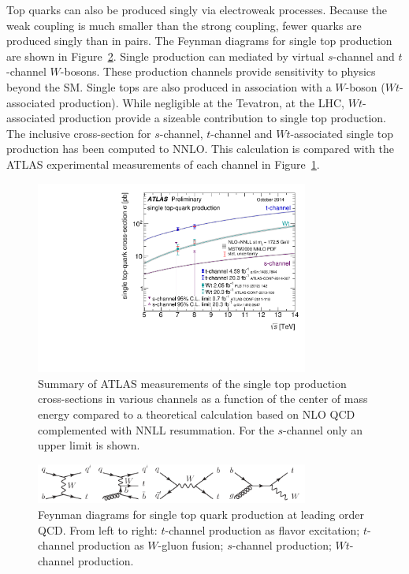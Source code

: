 Top quarks can also be produced singly via electroweak processes. Because the weak coupling is much smaller than the strong coupling, fewer quarks are produced singly than in pairs. The Feynman diagrams for single top production are shown in Figure~\ref{fig:tdiag}. Single production can mediated by virtual $s$-channel and $t$-channel $W$-bosons. These production channels provide sensitivity to physics beyond the SM. Single tops are also produced in association with a $W$-boson ($Wt$-associated production). While negligible at the Tevatron, at the LHC, $Wt$-associated production provide a sizeable contribution to single top production. The inclusive cross-section for $s$-channel, $t$-channel and $Wt$-associated single top production has been computed to NNLO. This calculation is compared with the ATLAS experimental measurements of each channel in Figure~\ref{fig:txsec}.



\begin{figure}
\centering
\includegraphics[width=0.8\textwidth]{fig/thry/singletop_allchanvsroots_ATLASonly.pdf}
\caption{Summary of ATLAS measurements of the single top production cross-sections in various channels as a function of the center of mass energy compared to a theoretical calculation based on NLO QCD complemented with NNLL resummation. For the $s$-channel only an upper limit is shown.}
\label{fig:txsec}
\end{figure}
\begin{figure}
\centering
\includegraphics[width=0.8\textwidth]{fig/thry/fig_singletop.png}
\caption{Feynman diagrams for single top quark production at leading order QCD. From left to right: $t$-channel production as flavor excitation; $t$-channel production as $W$-gluon fusion; $s$-channel production; $Wt$-channel production.}
\label{fig:tdiag}
\end{figure}

